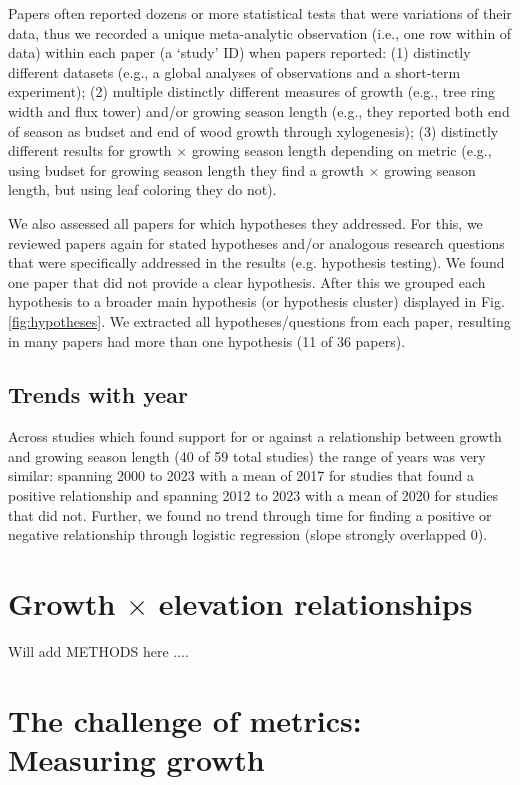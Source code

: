 \documentclass[11pt]{article}
\begin{document}
Papers often reported dozens or more statistical tests that were variations of their data, thus we recorded a unique meta-analytic observation (i.e., one row within of data) within each paper (a `study' ID) when papers reported: (1) distinctly different datasets (e.g., a global analyses of observations and a short-term experiment); (2) multiple distinctly different measures of growth (e.g., tree ring width and flux tower) and/or growing season length (e.g., they reported both end of season as budset and end of wood growth through xylogenesis); (3) distinctly different results for growth $\times$  growing season length depending on metric (e.g., using budset for growing season length they find a growth $\times$ growing season length, but using leaf coloring they do not). 

We also assessed all papers for which hypotheses they addressed. For this, we reviewed papers again for stated hypotheses and/or analogous research questions that were specifically addressed in the results (e.g. hypothesis testing).  We found one paper that did not provide a clear hypothesis. After this we grouped each hypothesis to a broader main hypothesis (or hypothesis cluster) displayed in Fig. \ref{fig:hypotheses}. We extracted all hypotheses/questions from each paper, resulting in many papers had more than one hypothesis (11 of 36 papers). %

\subsection*{Trends with year}
Across studies which found support for or against a relationship between growth and growing season length (40 of 59 total studies) the range of years was very similar: spanning 2000 to 2023 with a mean of 2017 for studies that found a positive relationship and spanning 2012 to 2023 with a mean of 2020 for studies that did not. Further, we found no trend through time for finding a positive or negative relationship through logistic regression (slope strongly overlapped 0). 

\section{Growth $\times$ elevation relationships}

Will add METHODS here ....

\section{The challenge of metrics: Measuring growth}
\end{document}
